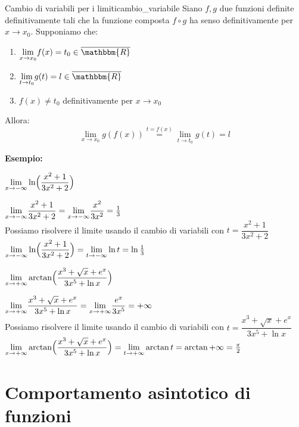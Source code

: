 \documentclass[12pt]{report}
\newcounter{theorem}
\newcounter{exercise}
\newcommand{\nmu}{}
\begin{document}
	\begin{theorem}{\nmu Cambio di variabili per i limiti}{cambio_variabile}
		Siano $f,g$ due funzioni definite definitivamente tali che la funzione composta $f \circ g$ ha senso definitivamente per $x \to x_0$. Supponiamo che:
		\begin{enumerate}
			\item $\mathlarger{\lim_{x \to x_0}}f(x) = t_0 \in \overline{\mathbbm{R}}$
			\item $\mathlarger{\lim_{t \to t_0}}g(t) = l \in \overline{\mathbbm{R}}$
			\item $f(x) \neq t_0$ definitivamente per $x \to x_0$
		\end{enumerate}
		Allora:
		\[
		\lim_{x \to x_0} g(f(x)) \overset{t = f(x)}{=} \lim_{t \to t_0}g(t)=l
		\]
	\end{theorem}
	\textbf{Esempio:}
	\begin{assignment}{}{}
		$\mathlarger{\lim_{x \to -\infty}}\ln \Bigl(\dfrac{x^2 + 1}{3x^2 + 2}\Bigr)$
		\begin{exercise}{}{}
			$\mathlarger{\lim_{x \to -\infty}}\dfrac{x^2 + 1}{3x^2 + 2} = \mathlarger{\lim_{x \to -\infty}}\dfrac{x^2}{3x^2} = \frac{1}{3}$ \\
			Possiamo risolvere il limite usando il cambio di variabili con $t = \dfrac{x^2 + 1}{3x^2 + 2}$ \\
			$\mathlarger{\lim_{x \to -\infty}}\ln \Bigl(\dfrac{x^2 + 1}{3x^2 + 2}\Bigr) = \mathlarger{\lim_{t \to -\infty}}\ln t = \ln \frac{1}{3}
			$
		\end{exercise}
	\end{assignment}
	\begin{assignment}{}{}
		$\mathlarger{\lim_{x \to +\infty}}\arctan \Bigl(\dfrac{x^3 + \sqrt{x} + e^x}{3x^5 + \ln x}\Bigr)$
		\begin{exercise}{}{}
			$\mathlarger{\lim_{x \to +\infty}}\dfrac{x^3 + \sqrt{x} + e^x}{3x^5 + \ln x} = \mathlarger{\lim_{x \to +\infty}}\dfrac{e^x}{3x^5} = +\infty$ \\
			Possiamo risolvere il limite usando il cambio di variabili con $t = \dfrac{x^3 + \sqrt{x} + e^x}{3x^5 + \ln x}$ \\
			$\mathlarger{\lim_{x \to +\infty}}\arctan \Bigl(\dfrac{x^3 + \sqrt{x} + e^x}{3x^5 + \ln x}\Bigr) = \mathlarger{\lim_{t \to +\infty}}\arctan t = \arctan +\infty = \frac{\pi}{2}
			$
		\end{exercise}
	\end{assignment}
	\section{Comportamento asintotico di funzioni}
\end{document}
